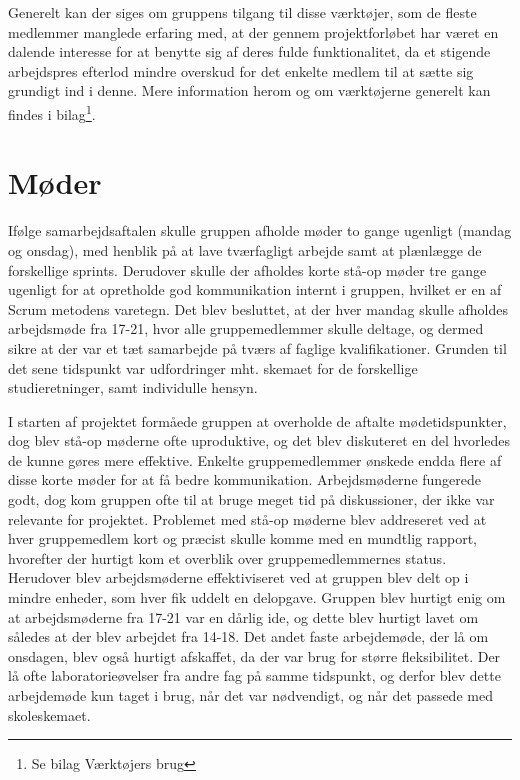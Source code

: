 Generelt kan der siges om gruppens tilgang til disse værktøjer, som de fleste medlemmer manglede erfaring med, at der gennem projektforløbet har været en dalende interesse for at benytte sig af deres fulde funktionalitet, da et stigende arbejdspres efterlod mindre overskud for det enkelte medlem til at sætte sig grundigt ind i denne. Mere information herom og om værktøjerne generelt kan findes i bilag\footnote{Se bilag Værktøjers brug}.

\section{Møder}
Ifølge samarbejdsaftalen skulle gruppen afholde møder to gange ugenligt (mandag og onsdag), med henblik på at lave tværfagligt arbejde samt at plænlægge
de forskellige sprints. Derudover skulle der afholdes korte stå-op møder tre gange ugenligt for at opretholde god kommunikation internt i gruppen,
hvilket er en af Scrum metodens varetegn.
Det blev besluttet, at der hver mandag skulle afholdes arbejdsmøde fra 17-21, hvor alle gruppemedlemmer skulle deltage, og dermed sikre at der var
et tæt samarbejde på tværs af faglige kvalifikationer. Grunden til det sene tidspunkt var udfordringer mht. skemaet for de forskellige studieretninger,
samt individulle hensyn. 

I starten af projektet formåede gruppen at overholde de aftalte mødetidspunkter, dog blev stå-op møderne ofte uproduktive, og det blev diskuteret en del 
hvorledes de kunne gøres mere effektive. Enkelte gruppemedlemmer ønskede endda flere af disse korte møder for at få bedre kommunikation. Arbejdsmøderne 
fungerede godt, dog kom gruppen ofte til at bruge meget tid på diskussioner, der ikke var relevante for projektet. Problemet med stå-op møderne 
blev addreseret ved at hver gruppemedlem kort og præcist skulle komme med en mundtlig rapport, hvorefter der hurtigt kom et overblik over gruppemedlemmernes
 status. Herudover blev arbejdsmøderne effektiviseret ved at gruppen blev delt op i mindre enheder, som hver fik uddelt en delopgave. Gruppen blev hurtigt 
 enig om at arbejdsmøderne fra 17-21 var en dårlig ide, og dette blev hurtigt lavet om således at der blev arbejdet fra 14-18. Det andet faste arbejdemøde, 
 der lå om onsdagen, blev også hurtigt afskaffet, da der var brug for større fleksibilitet. Der lå ofte laboratorieøvelser fra andre fag på samme tidspunkt, 
 og derfor blev dette arbejdemøde kun taget i brug, når det var nødvendigt, og når det passede med skoleskemaet.    

